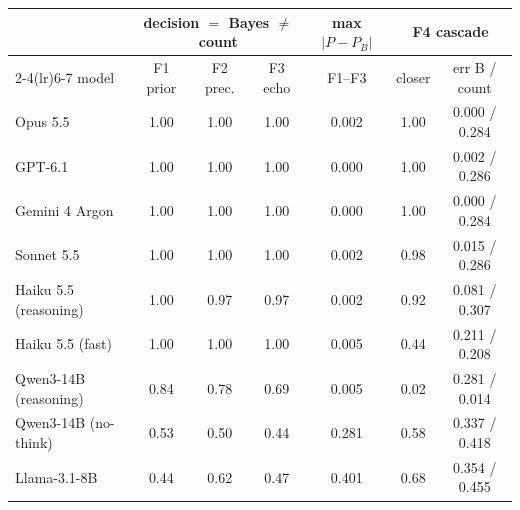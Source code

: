 \setlength{\tabcolsep}{4pt}
\begin{tabular}{lcccccc}
\toprule
 & \multicolumn{3}{c}{decision $=$ Bayes $\ne$ count} & max $|P-P_B|$ & \multicolumn{2}{c}{F4 cascade} \\
\cmidrule(lr){2-4}\cmidrule(lr){6-7}
model & F1 prior & F2 prec. & F3 echo & F1--F3 & closer & err B / count \\
\midrule
Opus 5.5 & 1.00 & 1.00 & 1.00 & 0.002 & 1.00 & 0.000 / 0.284 \\
GPT-6.1 & 1.00 & 1.00 & 1.00 & 0.000 & 1.00 & 0.002 / 0.286 \\
Gemini 4 Argon & 1.00 & 1.00 & 1.00 & 0.000 & 1.00 & 0.000 / 0.284 \\
Sonnet 5.5 & 1.00 & 1.00 & 1.00 & 0.002 & 0.98 & 0.015 / 0.286 \\
Haiku 5.5 (reasoning) & 1.00 & 0.97 & 0.97 & 0.002 & 0.92 & 0.081 / 0.307 \\
Haiku 5.5 (fast) & 1.00 & 1.00 & 1.00 & 0.005 & 0.44 & 0.211 / 0.208 \\
Qwen3-14B (reasoning) & 0.84 & 0.78 & 0.69 & 0.005 & 0.02 & 0.281 / 0.014 \\
Qwen3-14B (no-think) & 0.53 & 0.50 & 0.44 & 0.281 & 0.58 & 0.337 / 0.418 \\
Llama-3.1-8B & 0.44 & 0.62 & 0.47 & 0.401 & 0.68 & 0.354 / 0.455 \\
\bottomrule
\end{tabular}
